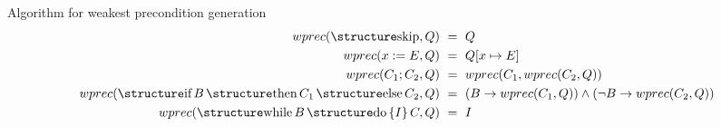 \documentclass[aspectratio=169]{beamer}
\begin{document}
%
%
%

\begin{slide}{Algorithm for weakest precondition generation}
  \begin{align*}
  wprec(\kw{skip},Q) & ~=~ Q\\
  wprec(x := E,Q)    & ~=~Q[x \mapsto E]\\
  wprec(C_1;C_2,Q)   & ~=~ wprec(C_1,wprec(C_2,Q))\\
  wprec(\kw{if}\,B\,\kw{then}\,C_1\,\kw{else}\,C_2,Q) & ~=~ (B \to wprec(C_1,Q)) \land (\neg B \to wprec(C_2,Q))\\
  wprec(\kw{while}\,B\,\kw{do}\,\{I\}\,C,Q) & ~=~ I
\end{align*}
\end{slide}
\end{document}

